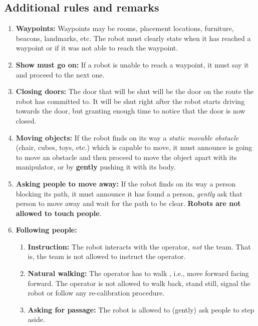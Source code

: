 \subsection{Additional rules and remarks}
\begin{enumerate}
	\item \textbf{Waypoints:} Waypoints may be rooms, placement locations, furniture, beacons, landmarks, etc. The robot must clearly state when it has reached a waypoint or if it was not able to reach the waypoint.

	\item \textbf{Show must go on:} If a robot is unable to reach a waypoint, it must say it and proceed to the next one.

	\item \textbf{Closing doors:}  The door that will be shut will be the door on the route the robot has committed to. It will be shut right after the robot starts driving towards the door, but granting enough time to notice that the door is now closed.	

	\item \textbf{Moving objects:} If the robot finds on its way a \textit{static movable obstacle} (chair, cubes, toys, etc.) which is capable to move, it must announce is going to move an obstacle and then proceed to move the object apart with its manipulator, or by \textbf{gently} pushing it with its body.

	\item \textbf{Asking people to move away:} If the robot finds on its way a person blocking its path, it must announce it has found a person, \textit{gently} ask that person to move away and wait for the path to be clear. \textbf{Robots are not allowed to touch people}.

	\item \textbf{Following people:} 
	\begin{enumerate}
		\item \textbf{Instruction:} The robot interacts with the operator, \emph{not} the team. That is, the team is not allowed to instruct the operator.
		\item \textbf{Natural walking:} The operator has to walk , i.e., move forward facing forward. 
		  The operator is not allowed to walk back, stand still, signal the robot or follow any re-calibration procedure.
		\item \textbf{Asking for passage:} The robot is allowed to (gently) ask people to step aside.
	\end{enumerate}
	

\end{enumerate}

